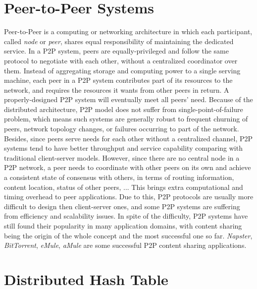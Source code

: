 \section{Peer-to-Peer Systems}
\label{s:peertopeersystems}

Peer-to-Peer is a computing or networking architecture in which each participant, called \textit{node} or \textit{peer}, shares equal responsibility of maintaining the dedicated service. In a P2P system, peers are equally-privileged and follow the same protocol to negotiate with each other, without a centralized coordinator over them. Instead of aggregating storage and computing power to a single serving machine, each peer in a P2P system contributes part of its resources to the network, and requires the resources it wants from other peers in return. A properly-designed P2P system will eventually meet all peers' need. Because of the distributed architecture, P2P model does not suffer from single-point-of-failure problem, which means such systems are generally robust to frequent churning of peers, network topology changes, or failures occurring to part of the network. Besides, since peers serve needs for each other without a centralized channel, P2P systems tend to have better throughput and service capability comparing with traditional client-server models. However, since there are no central node in a P2P network, a peer needs to coordinate with other peers on its own and achieve a consistent state of consensus with others, in terms of routing information, content location, status of other peers, ... This brings extra computational and timing overhead to peer applications. Due to this, P2P protocols are usually more difficult to design then client-server ones, and some P2P systems are suffering from efficiency and scalability issues. In spite of the difficulty, P2P systems have still found their popularity in many application domains, with content sharing being the origin of the whole concept and the most successful one so far. \textit{Napster}\cite{napster}, \textit{BitTorrent}\cite{bittorrent}, \textit{eMule}\cite{emule}, \textit{aMule}\cite{amule} are some successful P2P content sharing applications.

\section{Distributed Hash Table}
\label{s:distributedhashtable}

